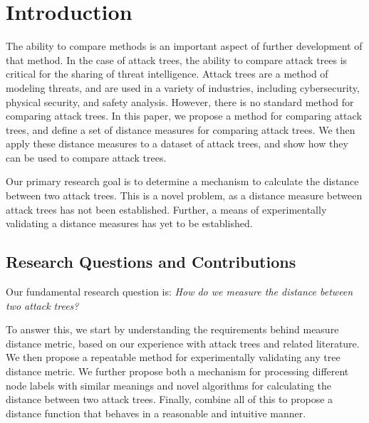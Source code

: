 

\section{Introduction}
\label{sec:introduction}

The ability to compare methods is an important aspect of further development of that method. In the case of attack trees, the ability to compare attack trees is critical for the sharing of threat intelligence. Attack trees are a method of modeling threats, and are used in a variety of industries, including cybersecurity, physical security, and safety analysis. However, there is no standard method for comparing attack trees. In this paper, we propose a method for comparing attack trees, and define a set of distance measures for comparing attack trees. We then apply these distance measures to a dataset of attack trees, and show how they can be used to compare attack trees.

Our primary research goal is to determine a mechanism to calculate the distance between two attack trees. This is a novel problem, as a distance measure between attack trees has not been established. Further, a means of experimentally validating a distance measures has yet to be established.


\subsection{Research Questions and Contributions}


Our fundamental research question is: \emph{How do we measure the distance between two attack trees?}

To answer this, we start by understanding the requirements behind measure distance metric, based on our experience with attack trees and related literature. We then propose a repeatable method for experimentally validating any tree distance metric. We further propose both a mechanism for processing different node labels with similar meanings and novel algorithms for calculating the distance between two attack trees. Finally, combine all of this to propose a distance function that behaves in a reasonable and intuitive manner.


